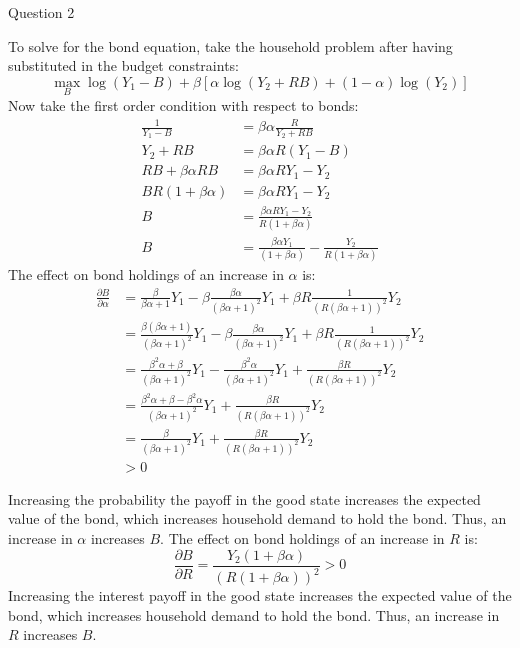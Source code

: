 \documentclass[a4paper]{article}
\begin{document}
\begin{questionbox}{Question 2}
\begin{enumerate}[(a)]
\begin{explanationbox}
					To solve for the bond equation, take the household problem after having substituted in the budget constraints:
					\[
						\max_B \log (Y_1 - B) + \beta \left[ \alpha \log (Y_2 + RB) + (1-\alpha)\log (Y_2) \right]
					\]
					Now take the ﬁrst order condition with respect to bonds:
					\begin{align*}
						\frac{1}{Y_1 - B} &= \beta\alpha \frac{R}{Y_2 + RB}\\
						Y_2 + RB &= \beta\alpha R (Y_1 - B)\\
						RB + \beta\alpha RB &= \beta\alpha RY_1-Y_2\\
						BR(1+\beta\alpha) &= \beta\alpha RY_1-Y_2\\
						B &= \frac{\beta\alpha RY_1-Y_2}{R(1+\beta\alpha)}\\
						B &= \frac{\beta\alpha Y_1}{(1+\beta\alpha)}-\frac{Y_2}{R(1+\beta\alpha)}
					\end{align*}
					The eﬀect on bond holdings of an increase in \( \alpha \) is:
					\begin{align*}
						\frac{\partial B}{\partial \alpha} &= \frac{\beta}{\beta\alpha + 1} Y_1 - \beta\frac{\beta\alpha}{(\beta\alpha + 1)^2}Y_1 + \beta R \frac{1}{(R(\beta\alpha +1))^2}Y_2\\
						&= \frac{\beta(\beta\alpha+1)}{(\beta\alpha+1)^2}Y_1 - \beta\frac{\beta\alpha}{(\beta\alpha+1)^2}Y_1 + \beta R \frac{1}{(R(\beta\alpha+1))^2}Y_2\\
						&= \frac{\beta^2\alpha+\beta}{(\beta\alpha+1)^2}Y_1 - \frac{\beta^2\alpha}{(\beta\alpha+1)^2}Y_1 + \frac{\beta R}{(R(\beta\alpha+1))^2}Y_2\\
						&= \frac{\beta^2\alpha+\beta-\beta^2\alpha}{(\beta\alpha+1)^2}Y_1 + \frac{\beta R}{(R(\beta\alpha+1))^2}Y_2\\
						&= \frac{\beta}{(\beta\alpha+1)^2}Y_1 + \frac{\beta R}{(R(\beta\alpha + 1))^2}Y_2\\
						&> 0
					\end{align*}
				\end{explanationbox}
				\begin{explanationbox}
					Increasing the probability the payoﬀ in the good state increases the expected value of the bond, which increases household demand to hold the bond. Thus, an increase in \( \alpha \) increases \( B \).
					The eﬀect on bond holdings of an increase in \( R \) is:
					\[
						\frac{\partial B}{\partial R} = \frac{Y_2(1+\beta\alpha)}{(R(1+\beta\alpha))^2} > 0
					\]
					Increasing the interest payoﬀ in the good state increases the expected value of the bond, which increases household demand to hold the bond. Thus, an increase in \( R \) increases \( B \).

\end{explanationbox}
\end{enumerate}
\end{questionbox}
\end{document}
